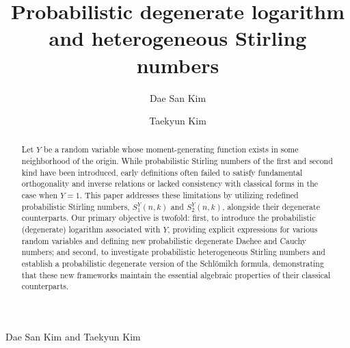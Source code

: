 \documentclass[a4paper,11pt]{amsart}
\begin{document}
\title[]{Probabilistic degenerate logarithm and heterogeneous Stirling numbers}



\author{Dae San  Kim}
\address{Department of Mathematics, Sogang University, Seoul 121-742, Republic of Korea}
%
\author{Taekyun  Kim}
\address{Department of Mathematics, Kwangwoon University, Seoul 139-701, Republic of Korea}




\begin{abstract} 
Let $Y$ be a random variable whose moment-generating function exists in some neighborhood of the origin. While probabilistic Stirling numbers of the first and second kind have been introduced, early definitions often failed to satisfy fundamental orthogonality and inverse relations or lacked consistency with classical forms in the case when $Y=1$. This paper addresses these limitations by utilizing redefined probabilistic Stirling numbers, $S_{1}^{Y}(n,k)$ and $S_{2}^{Y}(n,k)$, alongside their degenerate counterparts. Our primary objective is twofold: first, to introduce the probabilistic (degenerate) logarithm associated with $Y$, providing explicit expressions for various random variables and defining new probabilistic degenerate Daehee and Cauchy numbers; and second, to investigate probabilistic heterogeneous Stirling numbers and establish a probabilistic degenerate version of the Schl\"omilch formula, demonstrating that these new frameworks maintain the essential algebraic properties of their classical counterparts.
\end{abstract}

\maketitle

{\centerline{\scriptsize Dae San Kim and Taekyun Kim}}
\end{document}
